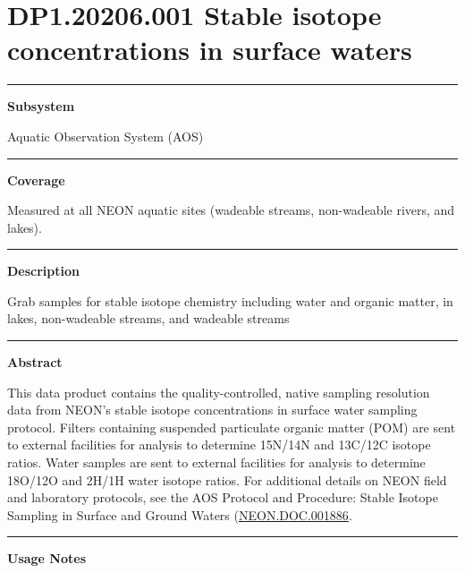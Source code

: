 \documentclass[]{article}
\begin{document}
\section{DP1.20206.001 Stable isotope concentrations in surface
waters}\label{dp1.20206.001-stable-isotope-concentrations-in-surface-waters}

\begin{center}\rule{0.5\linewidth}{\linethickness}\end{center}

\textbf{Subsystem}

Aquatic Observation System (AOS)

\begin{center}\rule{0.5\linewidth}{\linethickness}\end{center}

\textbf{Coverage}

Measured at all NEON aquatic sites (wadeable streams, non-wadeable
rivers, and lakes).

\begin{center}\rule{0.5\linewidth}{\linethickness}\end{center}

\textbf{Description}

Grab samples for stable isotope chemistry including water and organic
matter, in lakes, non-wadeable streams, and wadeable streams

\begin{center}\rule{0.5\linewidth}{\linethickness}\end{center}

\textbf{Abstract}

This data product contains the quality-controlled, native sampling
resolution data from NEON's stable isotope concentrations in surface
water sampling protocol. Filters containing suspended particulate
organic matter (POM) are sent to external facilities for analysis to
determine 15N/14N and 13C/12C isotope ratios. Water samples are sent to
external facilities for analysis to determine 18O/12O and 2H/1H water
isotope ratios. For additional details on NEON field and laboratory
protocols, see the AOS Protocol and Procedure: Stable Isotope Sampling
in Surface and Ground Waters
(\href{(http://data.neonscience.org/api/v0/documents/NEON.DOC.001886vE)}{NEON.DOC.001886}.

\begin{center}\rule{0.5\linewidth}{\linethickness}\end{center}

\textbf{Usage Notes}
\end{document}
